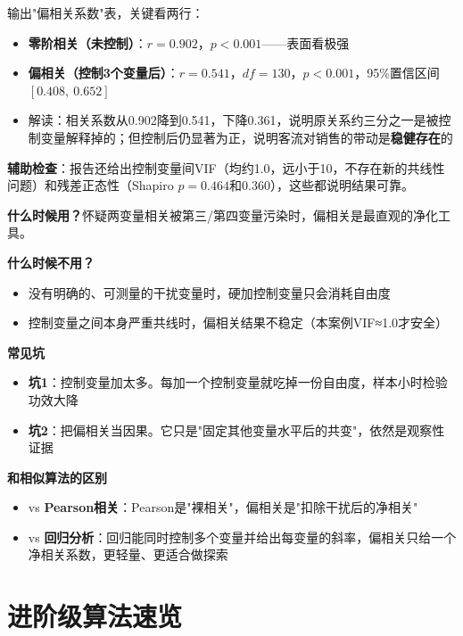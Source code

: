 \begin{algoresult}
输出"偏相关系数"表，关键看两行：
\begin{itemize}
    \item \textbf{零阶相关（未控制）}：$r=0.902$，$p<0.001$——表面看极强
    \item \textbf{偏相关（控制3个变量后）}：$r=0.541$，$df=130$，$p<0.001$，95\%置信区间$[0.408,\ 0.652]$
    \item 解读：相关系数从0.902降到0.541，下降0.361，说明原关系约三分之一是被控制变量解释掉的；但控制后仍显著为正，说明客流对销售的带动是\textbf{稳健存在}的
\end{itemize}

\textbf{辅助检查}：报告还给出控制变量间VIF（均约1.0，远小于10，不存在新的共线性问题）和残差正态性（Shapiro $p=0.464$和$0.360$），这些都说明结果可靠。
\end{algoresult}

\begin{algonotes}
\textbf{什么时候用？}怀疑两变量相关被第三/第四变量污染时，偏相关是最直观的净化工具。

\textbf{什么时候不用？}
\begin{itemize}
    \item 没有明确的、可测量的干扰变量时，硬加控制变量只会消耗自由度
    \item 控制变量之间本身严重共线时，偏相关结果不稳定（本案例VIF≈1.0才安全）
\end{itemize}

\textbf{常见坑}
\begin{itemize}
    \item \textbf{坑1}：控制变量加太多。每加一个控制变量就吃掉一份自由度，样本小时检验功效大降
    \item \textbf{坑2}：把偏相关当因果。它只是"固定其他变量水平后的共变"，依然是观察性证据
\end{itemize}

\textbf{和相似算法的区别}
\begin{itemize}
    \item vs \textbf{Pearson相关}：Pearson是"裸相关"，偏相关是"扣除干扰后的净相关"
    \item vs \textbf{回归分析}：回归能同时控制多个变量并给出每变量的斜率，偏相关只给一个净相关系数，更轻量、更适合做探索
\end{itemize}
\end{algonotes}

\section{进阶级算法速览}


